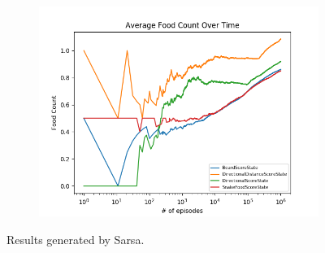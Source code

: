 \documentclass[result.tex]{subfiles}
\begin{document}
\begin{figure}[ht]
        \begin{subfigure}[b]{.35\linewidth}
            \includegraphics[width=\linewidth]{../images/sarsa/state/234/score_average_food_count_over_time.png}
        \end{subfigure}
        \caption{Results generated by Sarsa.}
        \label{fig:state_result_sarsa}
    \end{figure}

    \newpage
\end{document}
